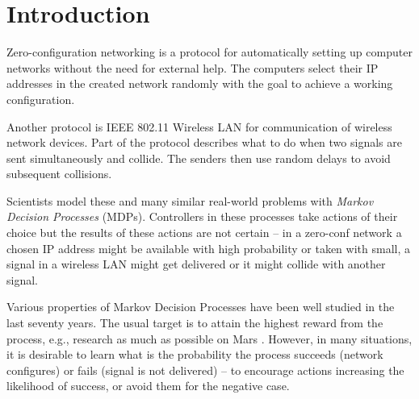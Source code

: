 \chapter{Introduction}


Zero-configuration networking is a protocol for automatically setting up
computer networks without the need for external help. The computers
select their IP addresses in the created network randomly with the goal
to achieve a working configuration.

Another protocol is IEEE 802.11 Wireless LAN for communication
of wireless network devices. Part of the protocol describes what to do
when two signals are sent simultaneously and collide. The senders then
use random delays to avoid subsequent collisions.


Scientists model these and many similar real-world problems with {\em
Markov Decision Processes} (MDPs). Controllers in these processes take
actions of their choice but the results of these actions are not
certain -- in a zero-conf network a chosen IP address might be available
with high probability or taken with small, a signal in a wireless LAN
might get delivered or it might collide with another signal.

Various properties of Markov Decision Processes have been well studied
in the last seventy years. The usual target is to attain the highest
reward from the process, e.g., research as much as possible on Mars
\parencite{MarsRover}.
However, in many situations, it is desirable to learn what is the
probability the process succeeds (network
configures) or fails (signal is not delivered) --
to encourage actions increasing the likelihood of success,
or avoid them for the negative case.


